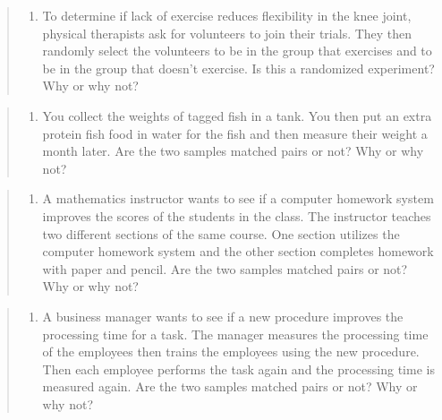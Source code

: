 \documentclass[]{book}
\providecommand{\tightlist}{%
  \setlength{\itemsep}{0pt}\setlength{\parskip}{0pt}}
\begin{document}
\begin{quote}
\begin{enumerate}
\def\labelenumi{\arabic{enumi}.}
\setcounter{enumi}{7}
\tightlist
\item
  To determine if lack of exercise reduces flexibility in the knee joint, physical therapists ask for volunteers to join their trials. They then randomly select the volunteers to be in the group that exercises and to be in the group that doesn't exercise. Is this a randomized experiment? Why or why not?
\end{enumerate}
\end{quote}

\begin{quote}
\begin{enumerate}
\def\labelenumi{\arabic{enumi}.}
\setcounter{enumi}{8}
\tightlist
\item
  You collect the weights of tagged fish in a tank. You then put an extra protein fish food in water for the fish and then measure their weight a month later. Are the two samples matched pairs or not? Why or why not?
\end{enumerate}
\end{quote}

\begin{quote}
\begin{enumerate}
\def\labelenumi{\arabic{enumi}.}
\setcounter{enumi}{9}
\tightlist
\item
  A mathematics instructor wants to see if a computer homework system improves the scores of the students in the class. The instructor teaches two different sections of the same course. One section utilizes the computer homework system and the other section completes homework with paper and pencil. Are the two samples matched pairs or not? Why or why not?
\end{enumerate}
\end{quote}

\begin{quote}
\begin{enumerate}
\def\labelenumi{\arabic{enumi}.}
\setcounter{enumi}{10}
\tightlist
\item
  A business manager wants to see if a new procedure improves the processing time for a task. The manager measures the processing time of the employees then trains the employees using the new procedure. Then each employee performs the task again and the processing time is measured again. Are the two samples matched pairs or not? Why or why not?
\end{enumerate}
\end{quote}
\end{document}
